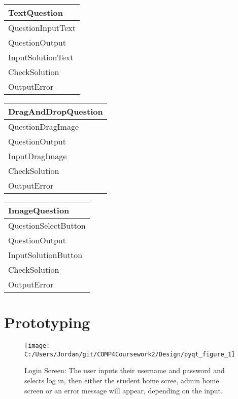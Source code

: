 \begin{center}
\begin{tabular}{|p{5cm}|} \hline
TextQuestion \\ \hline
QuestionInputText \\ 
QuestionOutput \\ \hline
InputSolutionText \\ 
CheckSolution \\
OutputError \\ \hline
\end{tabular}
\end{center}

\begin{center}
\begin{tabular}{|p{5cm}|} \hline
DragAndDropQuestion \\ \hline
QuestionDragImage \\ 
QuestionOutput \\ \hline
InputDragImage \\ 
CheckSolution \\
OutputError \\ \hline
\end{tabular}
\end{center}

\begin{center}
\begin{tabular}{|p{5cm}|} \hline
ImageQuestion \\ \hline
QuestionSelectButton \\ 
QuestionOutput \\ \hline
InputSolutionButton \\ 
CheckSolution \\
OutputError \\ \hline
\end{tabular}
\end{center}

\section{Prototyping}

\begin{figure}[H]
    \label{fig:print_function_result}\caption{Login Screen: The user inputs their username and password and selects log in, then either the student home scree, admin home screen or an error message will appear, depending on the input.}
    \texttt{[image: C:/Users/Jordan/git/COMP4Coursework2/Design/pyqt\_figure\_1]}
\end{figure}

